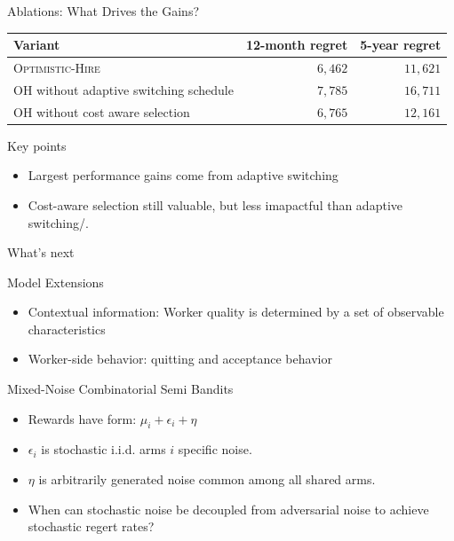 \documentclass[10pt,aspectratio=169]{beamer}
\newcommand{\OH}{\textsc{Optimistic-Hire}}
\begin{document}
\begin{frame}{Ablations: What Drives the Gains?}
    \small
    \begin{center}
    \begin{tabular}{lrr}
    \toprule
    Variant & 12-month regret & 5-year regret \\
    \midrule
    \OH & \(6{,}462\) & \(11{,}621\) \\
    OH without adaptive switching schedule & \(7{,}785\) & \(16{,}711\) \\
    OH without cost aware selection & \(6{,}765\) & \(12{,}161\) \\
    \bottomrule
    \end{tabular}
\end{center}

\vspace{0.6em}
\begin{block}{Key points}
\begin{itemize}
    \item Largest performance gains come from adaptive switching
    \item Cost-aware selection still valuable, but less imapactful than adaptive switching/.
\end{itemize}
\end{block}
\end{frame}



\begin{frame}{What's next}
    \begin{block}{Model Extensions}
    \begin{itemize}
        \item Contextual information: Worker quality is determined by a set of observable characteristics
        \item Worker-side behavior: quitting and acceptance behavior
    \end{itemize}
    \end{block}

    \begin{block}{Mixed-Noise Combinatorial Semi Bandits}
        \begin{itemize}
            \item Rewards have form: \(\mu_i + \epsilon_i + \eta\) 
            \item \(\epsilon_i\) is stochastic i.i.d. arms \(i\) specific noise.
            \item \(\eta\) is arbitrarily generated noise common among all shared arms.
            \item When can stochastic noise be decoupled from adversarial noise to achieve stochastic regert rates?
        \end{itemize}
    \end{block}
    
\end{frame}
\end{document}
